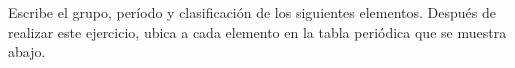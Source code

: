 \question Escribe el grupo, período y clasificación de los siguientes elementos. Después de realizar este ejercicio, ubica a cada elemento en la tabla
periódica que se muestra abajo.